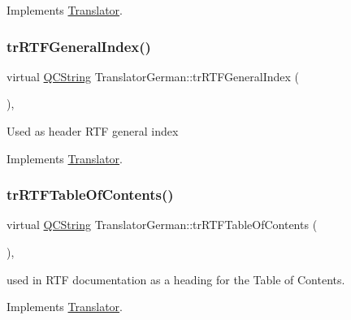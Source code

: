 Implements \mbox{\hyperlink{class_translator_afad391f3cbfb5ce6332b7239f8e2049a}{Translator}}.

\mbox{\label{class_translator_german_aa5da41acc42a3db2e34097853a8da92c}} 
\subsubsection{\texorpdfstring{trRTFGeneralIndex()}{trRTFGeneralIndex()}}
{\footnotesize\ttfamily virtual \mbox{\hyperlink{class_q_c_string}{Q\+C\+String}} Translator\+German\+::tr\+R\+T\+F\+General\+Index (\begin{DoxyParamCaption}{ }\end{DoxyParamCaption})\hspace{0.3cm}{\ttfamily [inline]}, {\ttfamily [virtual]}}

Used as header R\+TF general index 

Implements \mbox{\hyperlink{class_translator}{Translator}}.

\mbox{\label{class_translator_german_a33054ea6ee086d41966dea119b6c4624}} 
\subsubsection{\texorpdfstring{trRTFTableOfContents()}{trRTFTableOfContents()}}
{\footnotesize\ttfamily virtual \mbox{\hyperlink{class_q_c_string}{Q\+C\+String}} Translator\+German\+::tr\+R\+T\+F\+Table\+Of\+Contents (\begin{DoxyParamCaption}{ }\end{DoxyParamCaption})\hspace{0.3cm}{\ttfamily [inline]}, {\ttfamily [virtual]}}

used in R\+TF documentation as a heading for the Table of Contents. 

Implements \mbox{\hyperlink{class_translator}{Translator}}.

\mbox{\label{class_translator_german_ae64cb2149b95b51435642e00901c6d67}} 
